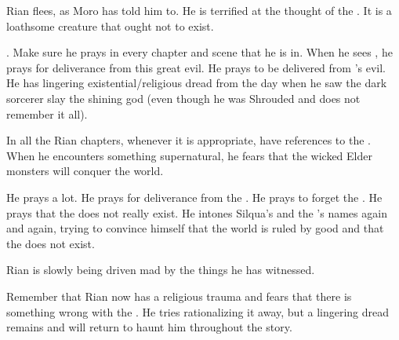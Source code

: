 \begin{comment}
  \section{Rian in the dungeon}
\end{comment}
\new
Rian flees, as Moro has told him to.
He is terrified at the thought of the \bane. 
It is a loathsome creature that ought not to exist. 

.
Make sure he prays in every chapter and scene that he is in.
When he sees \Ishnaruchaefir, he prays for deliverance from this great evil.
He prays to be delivered from \Isphet's evil. 
He has lingering existential/religious dread from the day when he saw the dark sorcerer slay the shining god (even though he was Shrouded and does not remember it all). 

In all the Rian chapters, whenever it is appropriate, have references to the . 
When he encounters something supernatural, he fears that the wicked Elder monsters will conquer the world. 

He prays a lot.
He prays for deliverance from the \bane. 
He prays to forget the \bane.
He prays that the \bane does not really exist. 
He intones Silqua's and the \sephiroth's names again and again, trying to convince himself that the world is ruled by good and that the \bane does not exist.  

Rian is slowly being driven mad by the things he has witnessed. 


Remember that Rian now has a religious trauma and fears that there is something wrong with the \sephiroth. 
He tries rationalizing it away, but a lingering dread remains and will return to haunt him throughout the story. 





